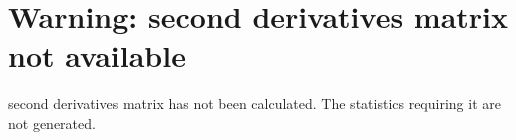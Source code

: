 \documentclass{article}
\begin{document}
\section{Warning: second derivatives matrix not available}\nThe second derivatives matrix has not been calculated. The statistics requiring it are not generated.%
\end{document}
